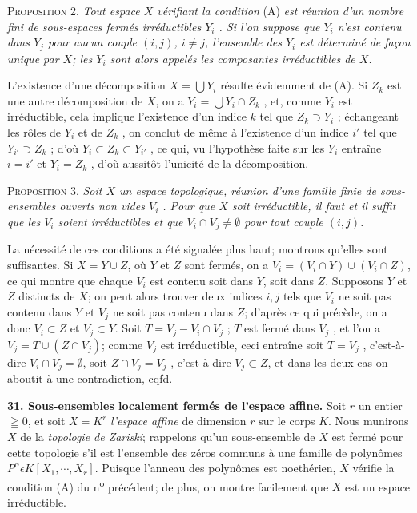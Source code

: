 \textsc{Proposition} 2. \textit{Tout espace $X$ vérifiant la condition} (A) \textit{est réunion d'un nombre fini de sous-espaces fermés irréductibles $Y_i$ . Si l'on suppose que $Y_i$ n'est contenu dans $Y_j$ pour aucun couple $(i, j)$, $i \neq j$, l'ensemble des $Y_i$ est déterminé de façon unique par $X$; les $Y_i$ sont alors appelés les composantes irréductibles de $X$.}

L'existence d'une décomposition $X = \bigcup Y_i$ résulte évidemment de (A). Si $Z_k$ est une autre décomposition de $X$, on a $Y_i = \bigcup Y_i \cap Z_k$ , et, comme $Y_i$ est irréductible, cela implique l'existence d'un indice $k$ tel que $Z_k \supset Y_i$ ; échangeant les rôles de $Y_i$ et de $Z_k$ , on conclut de même à l'existence d'un indice $i'$ tel que $Y_{i'} \supset Z_k$ ; d'où $Y_i \subset Z_k \subset Y_{i'}$ , ce qui, vu l'hypothèse faite sur les $Y_i$ entraîne $i = i'$ et $Y_i = Z_k$ , d'où aussitôt l'unicité de la décomposition.

\textsc{Proposition} 3. \textit{Soit $X$ un espace topologique, réunion d'une famille finie de sous-ensembles ouverts non vides $V_i$ . Pour que $X$ soit irréductible, il faut et il suffit que les $V_i$ soient irréductibles et que $V_i \cap V_j \neq \emptyset$ pour tout couple $(i, j)$.}



La nécessité de ces conditions a été signalée plus haut; montrons qu'elles sont suffisantes. Si $X = Y \cup Z$, où $Y$ et $Z$ sont fermés, on a $V_i = (V_i \cap Y) \cup (V_i \cap Z)$, ce qui montre que chaque $V_i$ est contenu soit dans $Y$, soit dans $Z$. Supposons $Y$ et $Z$ distincts de $X$; on peut alors trouver deux indices $i, j$ tels que $V_i$ ne soit pas contenu dans $Y$ et $V_j$ ne soit pas contenu dans $Z$; d'après ce qui précède, on a donc $V_i \subset Z$ et $V_j \subset Y$. Soit $T = V_j - V_i \cap V_j$ ; $T$ est fermé dans $V_j$ , et l'on a $V_j = T \cup (Z \cap V_j)$; comme $V_j$ est irréductible, ceci entraîne soit $T = V_j$ , c'est-à-dire $V_i \cap V_j = \emptyset$, soit $Z \cap V_j = V_j$ , c'est-à-dire $V_j \subset Z$, et dans les deux cas on aboutit à une contradiction, cqfd.

\textbf{31. Sous-ensembles localement fermés de l'espace affine.} Soit $r$ un entier $\geqq 0$, et soit $X = K^r$ \textit{l'espace affine} de dimension $r$ sur le corps $K$. Nous munirons $X$ de la \textit{topologie de Zariski}; rappelons qu'un sous-ensemble de $X$ est fermé pour cette topologie s'il est l'ensemble des zéros communs à une famille de polynômes $P^\alpha \epsilon K[X_1 , \cdots , X_r]$. Puisque l'anneau des polynômes est noethérien, $X$ vérifie la condition (A) du n\textsuperscript{o} précédent; de plus, on montre facilement que $X$ est un espace irréductible.

